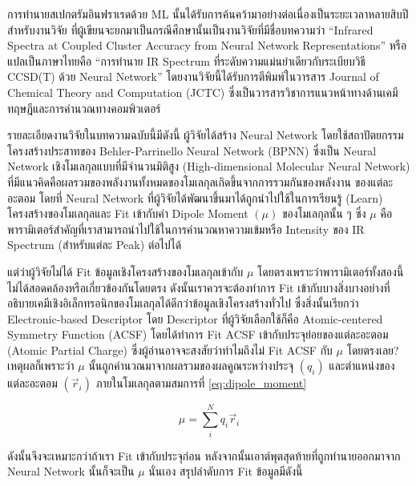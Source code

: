 การทำนายสเปกตรัมอินฟราเรดด้วย ML นั้นได้รับการค้นคว้ามาอย่างต่อเนื่องเป็นระยะเวลาหลายสิบปี\autocite{gastegger2017} สำหรับงานวิจัย%
ที่ผู้เขียนจะยกมาเป็นกรณีศึกษานั้นเป็นงานวิจัยที่มีชื่อบทความว่า \enquote{Infrared Spectra at Coupled Cluster Accuracy from Neural 
Network Representations} หรือแปลเป็นภาษาไทยคือ \enquote{การทำนาย IR Spectrum ที่ระดับความแม่นยำเดียวกับระเบียบวิธี CCSD(T) 
ด้วย Neural Network}\autocite{beckmann2022} โดยงานวิจัยนี้ได้รับการตีพิมพ์ในวารสาร Journal of Chemical Theory and Computation 
(JCTC) ซึ่งเป็นวารสารวิชาการแนวหน้าทางด้านเคมีทฤษฎีและการคำนวณทางคอมพิวเตอร์ 

รายละเอียดงานวิจัยในบทความฉบับนี้มีดังนี้ ผู้วิจัยได้สร้าง Neural Network โดยใช้สถาปัตยกรรมโครงสร้างประสาทของ Behler-Parrinello 
Neural Network (BPNN)\autocite{behler2007,behler2011b,behler2015} ซึ่งเป็น Neural Network เชิงโมเลกุลแบบที่มีจำนวนมิติสูง 
(High-dimensional Molecular Neural Network) ที่มีแนวคิดคือผลรวมของพลังงานทั้งหมดของโมเลกุลเกิดขึ้นจากการรวมกันของพลังงาน%
ของแต่ละอะตอม โดยที่ Neural Network ที่ผู้วิจัยได้พัฒนาขึ้นมาได้ถูกนำไปใช้ในการเรียนรู้ (Learn) โครงสร้างของโมเลกุลและ Fit เข้ากับค่า 
Dipole Moment $(\mu)$ ของโมเลกุลนั้น ๆ ซึ่ง $\mu$ คือพารามิเตอร์สำคัญที่เราสามารถนำไปใช้ในการคำนวณหาความเข้มหรือ Intensity 
ของ IR Spectrum (สำหรับแต่ละ Peak) ต่อไปได้

แต่ว่าผู้วิจัยไม่ได้ Fit ข้อมูลเชิงโครงสร้างของโมเลกุลเข้ากับ $\mu$ โดยตรงเพราะว่าพารามิเตอร์ทั้งสองนี้ไม่ได้สอดคล้องหรือเกี่ยวข้องกันโดยตรง 
ดังนั้นเราควรจะต้องทำการ Fit เข้ากับบางสิ่งบางอย่างที่อธิบายเคมีเชิงอิเล็กทรอนิกของโมเลกุลได้ดีกว่าข้อมูลเชิงโครงสร้างทั่วไป ซึ่งสิ่งนั้นเรียกว่า 
Electronic-based Descriptor โดย Descriptor ที่ผู้วิจัยเลือกใช้ก็คือ Atomic-centered Symmetry Function (ACSF) โดยได้ทำการ 
Fit ACSF เข้ากับประจุย่อยของแต่ละอะตอม (Atomic Partial Charge) ซึ่งผู้อ่านอาจจะสงสัยว่าทำไมถึงไม่ Fit ACSF กับ $\mu$ โดยตรงเลย? 
เหตุผลก็เพราะว่า $\mu$ นั้นถูกคำนวณมาจากผลรวมของผลคูณระหว่างประจุ $(q_{i})$ และตำแหน่งของแต่ละอะตอม $(\vec{r}_{i})$ 
ภายในโมเลกุลตามสมการที่ \ref{eq:dipole_moment}

\begin{equation}\label{eq:dipole_moment}
    \mu = \sum^{N}_{i} q_{i}\vec{r}_{i}
\end{equation}

\noindent ดังนั้นจึงจะเหมาะกว่าถ้าเรา Fit เข้ากับประจุก่อน หลังจากนั้นเอาต์พุตสุดท้ายที่ถูกทำนายออกมาจาก Neural Network นั้นก็จะเป็น 
$\mu$ นั่นเอง สรุปลำดับการ Fit ข้อมูลมีดังนี้ 


